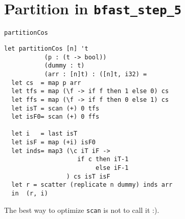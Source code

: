 \section{Partition in \texttt{bfast\_step\_5}} %


%


\begin{frame}[fragile]{\texttt{partitionCos}}

    \begin{verbatim}
let partitionCos [n] 't
           (p : (t -> bool))
           (dummy : t)
           (arr : [n]t) : ([n]t, i32) =
  let cs  = map p arr
  let tfs = map (\f -> if f then 1 else 0) cs
  let ffs = map (\f -> if f then 0 else 1) cs
  let isT = scan (+) 0 tfs
  let isF0= scan (+) 0 ffs

  let i   = last isT
  let isF = map (+i) isF0
  let inds= map3 (\c iT iF ->
                    if c then iT-1
                         else iF-1
                 ) cs isT isF
  let r = scatter (replicate n dummy) inds arr
  in  (r, i)
  \end{verbatim}

  \pause

The best way to optimize \texttt{scan} is not to call it :).

\end{frame}


